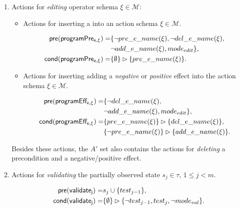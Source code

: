 \documentclass[letterpaper]{article} %
\newcommand{\pre}{\mathsf{pre}}     %
\newcommand{\cond}{\mathsf{cond}}   %
\begin{document}
\begin{itemize}
\begin{enumerate}
\item Actions for {\em editing} operator schema $\xi\in\mathcal{M}$:
\begin{itemize}
\item Actions for inserting a into an action schema $\xi\in\mathcal{M}$.

\begin{small}
\begin{align*}
\hspace*{7pt}\pre(\mathsf{programPre_{e,\xi}})=&\{\neg pre\_e\_name(\xi), \neg del\_e\_name(\xi),\\
& \neg add\_e\_name(\xi), mode_{edit}\},\\
\cond(\mathsf{programPre_{e,\xi}})=&\{\emptyset\}\rhd\{pre\_e\_name(\xi)\}.
\end{align*}
\end{small}


\item Actions for inserting adding a {\em negative} or {\em positive} effect into the action schema $\xi\in\mathcal{M}$.

\begin{small}
\begin{align*}
\hspace*{7pt}\pre(\mathsf{programEff_{e,\xi}})=&\{\neg del\_e\_name(\xi),\\
& \neg add\_e\_name(\xi),mode_{edit}\},\\
\cond(\mathsf{programEff_{e,\xi}})=&\{pre\_e\_name(\xi)\}\rhd\{del\_e\_name(\xi)\},\\
&\{\neg pre\_e\_name(\xi)\}\rhd\{add\_e\_name(\xi)\}.
\end{align*}
\end{small}
\end{itemize}
Besides these actions, the $A'$ set also contains the actions for {\em deleting} a precondition and a negative/positive effect.

\item Actions for {\em validating} the partially observed state $s_j\in\tau$, {\tt\small $1\leq j< m$}.
\begin{small}
\begin{align*}
\hspace*{7pt}\pre(\mathsf{validate_{j}})=&s_j\cup\{test_{j-1}\},\\
\cond(\mathsf{validate_{j}})=&\{\emptyset\}\rhd\{\neg test_{j-1}, test_j,\neg mode_{val}\}.
\end{align*}
\end{small}
\end{enumerate}
\end{itemize}
\end{document}
